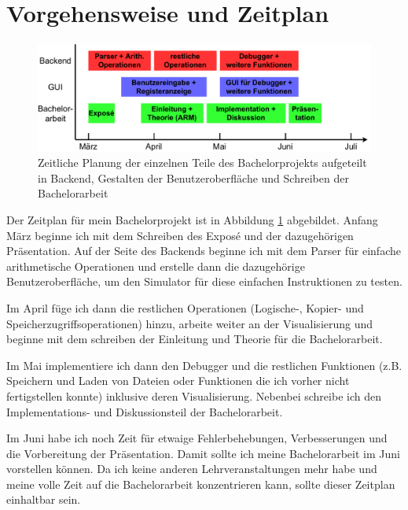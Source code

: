 \documentclass[a4paper, 11pt, onecolumn]{article}
\begin{document}
\section{Vorgehensweise und Zeitplan}

\begin{figure}[!htb]	
	\includegraphics[width=0.8\paperwidth]{data/timeline}
	\caption{Zeitliche Planung der einzelnen Teile des Bachelorprojekts aufgeteilt in Backend, Gestalten der Benutzeroberfläche und Schreiben der Bachelorarbeit}
	\label{timeline}
\end{figure}

Der Zeitplan für mein Bachelorprojekt ist in Abbildung \ref{timeline} abgebildet. Anfang März beginne ich mit dem Schreiben des Exposé und der dazugehörigen Präsentation. Auf der Seite des Backends beginne ich mit dem Parser für einfache arithmetische Operationen und erstelle dann die dazugehörige Benutzeroberfläche, um den Simulator für diese einfachen Instruktionen zu testen.

Im April füge ich dann die restlichen Operationen (Logische-, Kopier- und Speicherzugriffsoperationen) hinzu, arbeite weiter an der Visualisierung und beginne mit dem schreiben der Einleitung und Theorie für die Bachelorarbeit.

Im Mai implementiere ich dann den Debugger und die restlichen Funktionen (z.B. Speichern und Laden von Dateien oder Funktionen die ich vorher nicht fertigstellen konnte) inklusive deren Visualisierung. Nebenbei schreibe ich den Implementations- und Diskussionsteil der Bachelorarbeit.

Im Juni habe ich noch Zeit für etwaige Fehlerbehebungen, Verbesserungen und die Vorbereitung der Präsentation. Damit sollte ich meine Bachelorarbeit im Juni vorstellen können. Da ich keine anderen Lehrveranstaltungen mehr habe und meine volle Zeit auf die Bachelorarbeit konzentrieren kann, sollte dieser Zeitplan einhaltbar sein.





\end{document}

